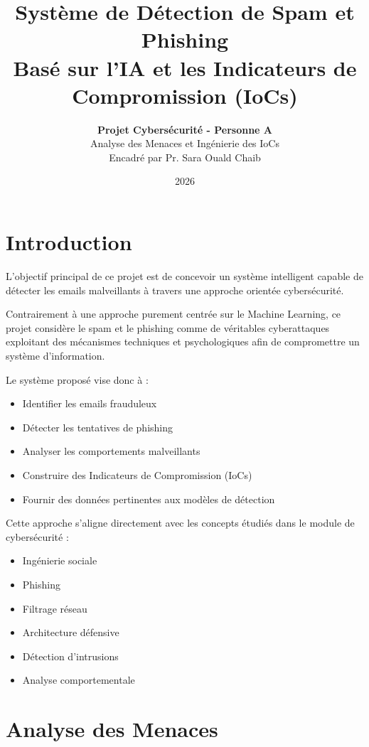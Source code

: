\documentclass[12pt,a4paper]{article}
\title{
\vspace{-2cm}
\textbf{\Huge Système de Détection de Spam et Phishing}\\
\vspace{0.3cm}
\Large Basé sur l'IA et les Indicateurs de Compromission (IoCs)
}
\author{
\textbf{Projet Cybersécurité - Personne A}\\
Analyse des Menaces et Ingénierie des IoCs\\
Encadré par Pr. Sara Ouald Chaib
}
\date{2026}
\begin{document}
\maketitle

\tableofcontents
\newpage

\section{Introduction}

L'objectif principal de ce projet est de concevoir un système intelligent capable de détecter les emails malveillants à travers une approche orientée cybersécurité.

Contrairement à une approche purement centrée sur le Machine Learning, ce projet considère le spam et le phishing comme de véritables cyberattaques exploitant des mécanismes techniques et psychologiques afin de compromettre un système d'information.

Le système proposé vise donc à :
\begin{itemize}
    \item Identifier les emails frauduleux
    \item Détecter les tentatives de phishing
    \item Analyser les comportements malveillants
    \item Construire des Indicateurs de Compromission (IoCs)
    \item Fournir des données pertinentes aux modèles de détection
\end{itemize}

Cette approche s'aligne directement avec les concepts étudiés dans le module de cybersécurité :
\begin{itemize}
    \item Ingénierie sociale
    \item Phishing
    \item Filtrage réseau
    \item Architecture défensive
    \item Détection d'intrusions
    \item Analyse comportementale
\end{itemize}

\section{Analyse des Menaces}
\end{document}
